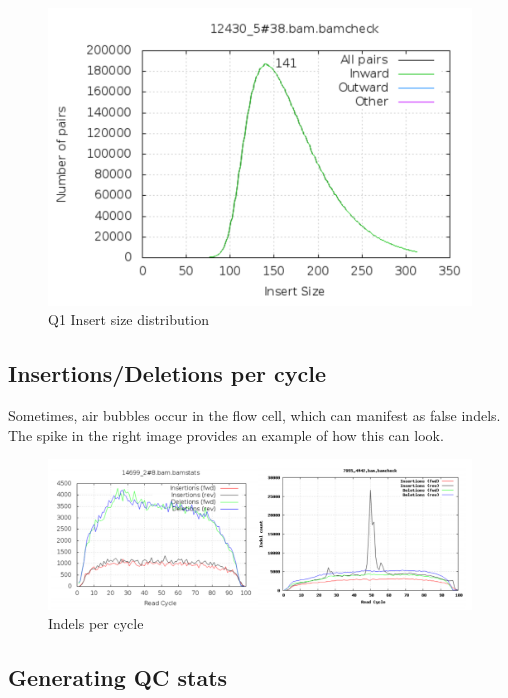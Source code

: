 \documentclass[11pt]{article}
\begin{document}
    \begin{figure}
\centering
\includegraphics{img/insert_size_quiz.png}
\caption{Q1 Insert size distribution}
\end{figure}

    \hypertarget{insertionsdeletions-per-cycle}{%
\subsection{Insertions/Deletions per
cycle}\label{insertionsdeletions-per-cycle}}

Sometimes, air bubbles occur in the flow cell, which can manifest as
false indels. The spike in the right image provides an example of how
this can look.

    \begin{figure}
\centering
\includegraphics{img/indels_per_cycle_comparison.png}
\caption{Indels per cycle}
\end{figure}

    \hypertarget{generating-qc-stats}{%
\subsection{Generating QC stats}\label{generating-qc-stats}}
\end{document}
